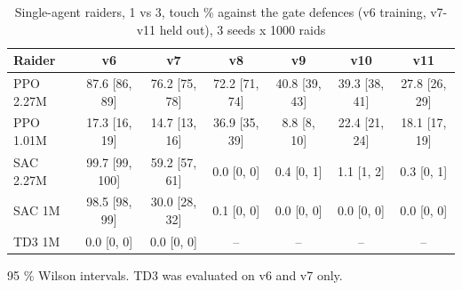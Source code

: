 \begin{table}[t]
\centering
\caption{Single-agent raiders, 1 vs 3, touch \% against the gate defences (v6 training, v7-v11 held out), 3 seeds x 1000 raids}
\label{tab:T1_single_agent_algorithms}
\begin{tabular}{lcccccc}
\toprule
Raider & v6 & v7 & v8 & v9 & v10 & v11 \\
\midrule
PPO 2.27M & 87.6 [86, 89] & 76.2 [75, 78] & 72.2 [71, 74] & 40.8 [39, 43] & 39.3 [38, 41] & 27.8 [26, 29] \\
PPO 1.01M & 17.3 [16, 19] & 14.7 [13, 16] & 36.9 [35, 39] & 8.8 [8, 10] & 22.4 [21, 24] & 18.1 [17, 19] \\
SAC 2.27M & 99.7 [99, 100] & 59.2 [57, 61] & 0.0 [0, 0] & 0.4 [0, 1] & 1.1 [1, 2] & 0.3 [0, 1] \\
SAC 1M & 98.5 [98, 99] & 30.0 [28, 32] & 0.1 [0, 0] & 0.0 [0, 0] & 0.0 [0, 0] & 0.0 [0, 0] \\
TD3 1M & 0.0 [0, 0] & 0.0 [0, 0] & -- & -- & -- & -- \\
\bottomrule
\end{tabular}
\par\smallskip\footnotesize 95 \% Wilson intervals. TD3 was evaluated on v6 and v7 only.
\end{table}
